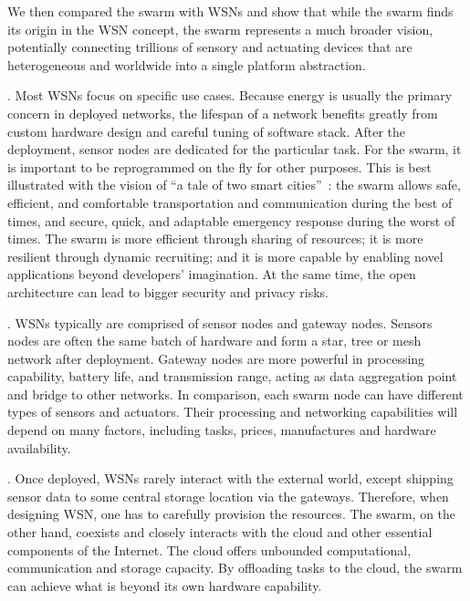 We then compared the swarm with WSNs and show that while the swarm finds its
origin in the WSN concept, the swarm represents a much broader vision,
potentially connecting trillions of sensory and actuating devices that are
heterogeneous and worldwide into a single platform abstraction.

. Most WSNs
focus on specific use cases. Because energy is usually the primary concern in
deployed networks, the lifespan of a network benefits greatly from custom
hardware design and careful tuning of software stack. After the deployment,
sensor nodes are dedicated for the particular task. For the swarm, it is
important to be reprogrammed on the fly for other purposes. This is best
illustrated with the vision of ``a tale of two smart
cities''~\cite{lee2012terraswarm}: the swarm allows safe, efficient, and
comfortable transportation and communication during the best of times, and
secure, quick, and adaptable emergency response during the worst of times. The
swarm is more efficient through sharing of resources; it is more resilient
through dynamic recruiting; and it is more capable by enabling novel
applications beyond developers' imagination. At the same time, the open
architecture can lead to bigger security and privacy risks.

. WSNs
typically are comprised of sensor nodes and gateway nodes. Sensors nodes are
often the same batch of hardware and form a star, tree or mesh network after
deployment. Gateway nodes are more powerful in processing capability, battery
life, and transmission range, acting as data aggregation point and bridge to
other networks. In comparison, each swarm node can have different types of
sensors and actuators. Their processing and networking capabilities will depend
on many factors, including tasks, prices, manufactures and hardware
availability.

. Once deployed, WSNs rarely interact with the external world,
except shipping sensor data to some central storage location via the
gateways. Therefore, when designing WSN, one has to carefully provision the
resources. The swarm, on the other hand, coexists and closely interacts with the
cloud and other essential components of the Internet. The cloud offers unbounded
computational, communication and storage capacity. By offloading tasks to the
cloud, the swarm can achieve what is beyond its own hardware capability.

